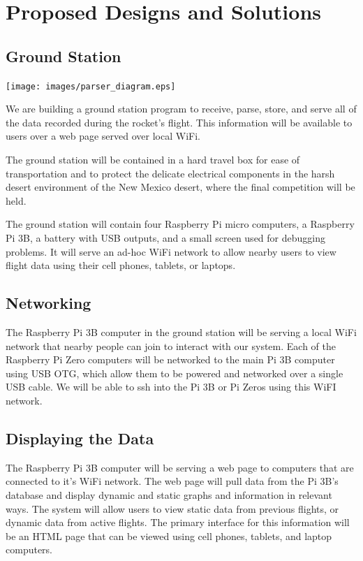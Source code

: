 \documentclass[onecolumn, draftclsnofoot, 10pt, compsoc]{IEEEtran}
\begin{document}

\section{Proposed Designs and Solutions}

\subsection{Ground Station}

\begin{center}
	\texttt{[image: images/parser\_diagram.eps]}
    \label{parser-diagram}
\end{center}

We are building a ground station program to receive, parse, store, and serve all of the data recorded during the rocket's flight.  This information will be available to users over a web page served over local WiFi.

The ground station will be contained in a hard travel box for ease of transportation and to protect the delicate electrical components in the harsh desert environment of the New Mexico desert, where the final competition will be held.

The ground station will contain four Raspberry Pi micro computers, a Raspberry Pi 3B, a battery with USB outputs, and a small screen used for debugging problems.  It will serve an ad-hoc WiFi network to allow nearby users to view flight data using their cell phones, tablets, or laptops.

\subsection{Networking}
The Raspberry Pi 3B computer in the ground station will be serving a local WiFi network that nearby people can join to interact with our system.  Each of the Raspberry Pi Zero computers will be networked to the main Pi 3B computer using USB OTG, which allow them to be powered and networked over a single USB cable.  We will be able to ssh into the Pi 3B or Pi Zeros using this WiFI network.

\subsection{Displaying the Data}
The Raspberry Pi 3B computer will be serving a web page to computers that are connected to it's WiFi network.  The web page will pull data from the Pi 3B's database and display dynamic and static graphs and information in relevant ways.  The system will allow users to view static data from previous flights, or dynamic data from active flights.  The primary interface for this information will be an HTML page that can be viewed using cell phones, tablets, and laptop computers.
\end{document}

